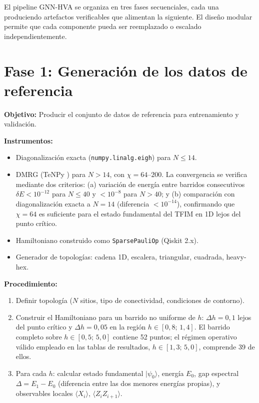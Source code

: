 \documentclass[11pt,a4paper,spanish]{book}
\begin{document}
El pipeline GNN-HVA se organiza en tres fases secuenciales, cada una produciendo artefactos verificables que alimentan la siguiente. El diseño modular permite que cada componente pueda ser reemplazado o escalado independientemente.

\section{Fase 1: Generación de los datos de referencia}
\label{sec:fase1}

\textbf{Objetivo:} Producir el conjunto de datos de referencia para entrenamiento y validación.

\textbf{Instrumentos:}
\begin{itemize}
    \item Diagonalización exacta (\texttt{numpy.linalg.eigh}) para $N \leq 14$.
    \item DMRG (TeNPy \citep{hauschild2018}) para $N > 14$, con $\chi = 64$--$200$. La convergencia se verifica mediante dos criterios: (a) variación de energía entre barridos consecutivos $\delta E < 10^{-12}$ para $N \leq 40$ y $< 10^{-8}$ para $N > 40$; y (b) comparación con diagonalización exacta a $N = 14$ (diferencia $< 10^{-14}$), confirmando que $\chi = 64$ es suficiente para el estado fundamental del TFIM en 1D lejos del punto crítico.
    \item Hamiltoniano construido como \texttt{SparsePauliOp} (Qiskit 2.x).
    \item Generador de topologías: cadena 1D, escalera, triangular, cuadrada, heavy-hex.
\end{itemize}

\textbf{Procedimiento:}
\begin{enumerate}
    \item Definir topología ($N$ sitios, tipo de conectividad, condiciones de contorno).
    \item Construir el Hamiltoniano para un barrido no uniforme de $h$: $\Delta h = 0,1$ lejos del punto crítico y $\Delta h = 0,05$ en la región $h \in [0{,}8;\, 1{,}4]$. El barrido completo sobre $h \in [0{,}5;\, 5{,}0]$ contiene 52 puntos; el régimen operativo válido empleado en las tablas de resultados, $h \in [1{,}3;\, 5{,}0]$, comprende 39 de ellos.
    \item Para cada $h$: calcular estado fundamental $|\psi_0\rangle$, energía $E_0$, gap espectral $\Delta = E_1 - E_0$ (diferencia entre las dos menores energías propias), y observables locales $\langle X_i \rangle$, $\langle Z_i Z_{i+1} \rangle$.
\end{enumerate}
\end{document}
